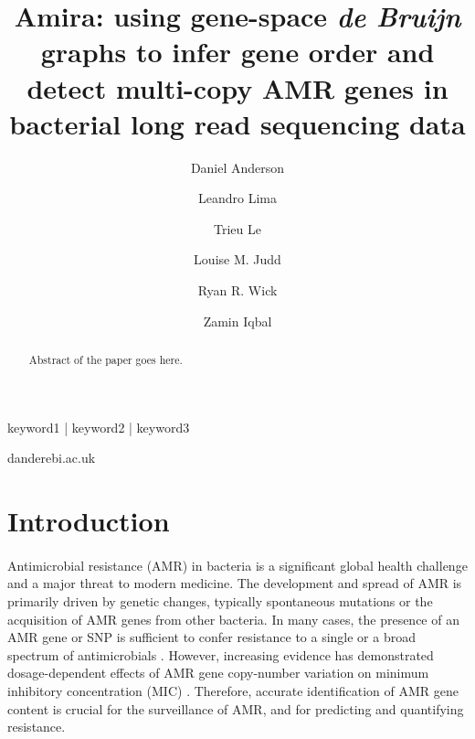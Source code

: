 
\title{Amira: using gene-space \textit{de Bruijn} graphs to infer gene order and detect multi-copy AMR genes in bacterial long read sequencing data}
\shorttitle{}


\author[1, \Letter]{Daniel Anderson }
\author[1]{Leandro Lima }
\author[2]{Trieu Le }
\author[3]{Louise M. Judd }
\author[3]{Ryan R. Wick }
\author[1,2]{Zamin Iqbal }

\date{}

\maketitle

\begin{abstract}
Abstract of the paper goes here.
\end{abstract}

\begin{keywords}
keyword1 | keyword2 | keyword3
\end{keywords}

\begin{corrauthor}
dander\at ebi.ac.uk
\end{corrauthor}

\section*{Introduction}
\paragraph{}
Antimicrobial resistance (AMR) in bacteria is a significant global health challenge and a major threat to modern medicine. The development and spread of AMR is primarily driven by genetic changes, typically spontaneous mutations or the acquisition of AMR genes from other bacteria. In many cases, the presence of an AMR gene or SNP is sufficient to confer resistance to a single or a broad spectrum of antimicrobials \cite{10.1128/AEM.02873-15}. However, increasing evidence has demonstrated dosage-dependent effects of AMR gene copy-number variation on minimum inhibitory concentration (MIC) \cite{10.1128/aac.02026-19, 10.1128/AAC.46.10.3334-3336.2002}. Therefore, accurate identification of AMR gene content is crucial for the surveillance of AMR, and for predicting and quantifying resistance. 
